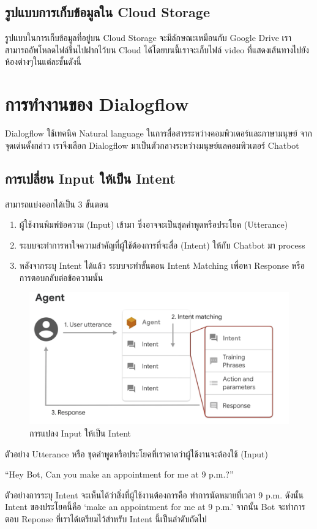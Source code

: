 \subsection{รูปแบบการเก็บข้อมูลใน Cloud Storage}
รูปแบบในการเก็บข้อมูลที่อยู่บน Cloud Storage จะมีลักษณะเหมือนกับ Google Drive เราสามารถอัพโหลดไฟล์ขึ้นไปฝากไว้บน Cloud
ได้โดยบนนี้เราจะเก็บไฟล์ video ที่แสดงเส้นทางไปยังห้องต่างๆในแต่ละชั้นดังนี้



\section{การทำงานของ Dialogflow}

Dialogflow ใช้เทคนิค Natural language ในการสื่อสารระหว่างคอมพิวเตอร์เเละภาษามนุษย์ จากจุดเด่นดั้งกล่าว เราจีงเลือก
Dialogflow มาเป็นตัวกลางระหว่างมนุษย์แลคอมพิวเตอร์ Chatbot~\cite{df-overview}
\subsection{การเปลี่ยน Input ให้เป็น Intent}
สามารถแบ่งออกได้เป็น 3 ขั้นตอน
\begin{enumerate}
  \item ผู้ใช้งานพิมพ์ข้อความ (Input) เข้ามา ซึ่งอาจจะเป็นชุดคำพูดหรือประโยค (Utterance)
  \item ระบบจะทำการหาใจความสำคัญที่ผู้ใช้ต้องการที่จะสื่อ (Intent) ให้กับ Chatbot มา process
  \item หลังจากระบุ Intent ได้แล้ว ระบบจะทำขั้นตอน Intent Matching เพื่อหา Response หรือการตอบกลับต่อข้อความนั้น
\end{enumerate}

\begin{figure}[hbt!]
  \begin{center}
    \includegraphics[width=\textwidth,keepaspectratio]{pic/df_input_intent_conventer.png}
  \end{center}
  \caption{การแปลง Input ให้เป็น Intent}
  \label{fig:df-TTI}
\end{figure}
ตัวอย่าง Utterance หรือ ชุดคำพูดหรือประโยคที่เราคาดว่าผู้ใช้งานจะต้องใช้ (Input)
\begin{center}
``Hey Bot, Can you make an appointment for me at 9 p.m.?''
\end{center}
ตัวอย่างการระบุ Intent จะเห็นได้ว่าสิ่งที่ผู้ใช้งานต้องการคือ ทำการนัดหมายที่เวลา 9 p.m. ดังนั้น
Intent ของประโยคนี้คือ `make an appointment for me at 9 p.m.' จากนั้น Bot
จะทำการตอบ  Reponse ที่เราได้เตรียมไว้สำหรับ Intent นี้เป็นลำดับถัดไป
